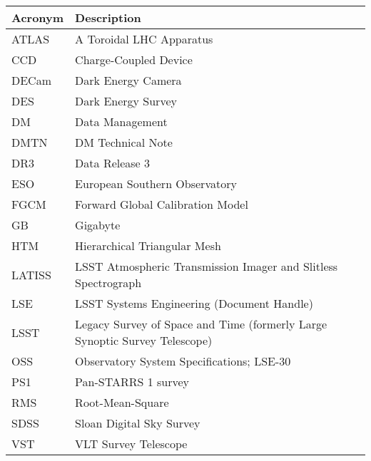\addtocounter{table}{-1}
\begin{longtable}{p{}p{}}\hline
\textbf{Acronym} & \textbf{Description}  \\\hline

ATLAS & A Toroidal LHC Apparatus \\\hline
CCD & Charge-Coupled Device \\\hline
DECam & Dark Energy Camera \\\hline
DES & Dark Energy Survey \\\hline
DM & Data Management \\\hline
DMTN & DM Technical Note \\\hline
DR3 & Data Release 3 \\\hline
ESO & European Southern Observatory \\\hline
FGCM & Forward Global Calibration Model \\\hline
GB & Gigabyte \\\hline
HTM & Hierarchical Triangular Mesh \\\hline
LATISS & LSST Atmospheric Transmission Imager and Slitless Spectrograph \\\hline
LSE & LSST Systems Engineering (Document Handle) \\\hline
LSST & Legacy Survey of Space and Time (formerly Large Synoptic Survey Telescope) \\\hline
OSS & Observatory System Specifications; LSE-30 \\\hline
PS1 & Pan-STARRS 1 survey \\\hline
RMS & Root-Mean-Square \\\hline
SDSS & Sloan Digital Sky Survey \\\hline
VST & VLT Survey Telescope \\\hline
\end{longtable}
